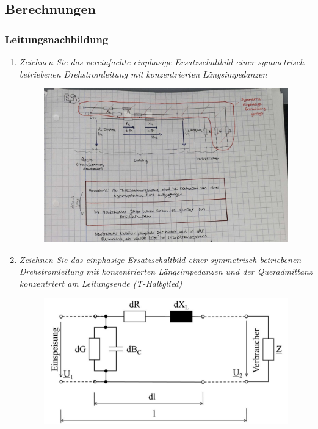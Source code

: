 \documentclass[12pt]{article}
\begin{document}
\subsection{Berechnungen}
\subsubsection{Leitungsnachbildung}



\begin{enumerate}
    \item \textit{Zeichnen Sie das vereinfachte einphasige 
    Ersatzschaltbild einer symmetrisch betriebenen 
    Drehstromleitung mit konzentrierten 
    Längsimpedanzen}\\
    \begin{figure}[h]
        \includegraphics[width=\textwidth]{figures/Schaltbild.jpg}
        \centering
    \end{figure}

    \item \textit{Zeichnen Sie das einphasige Ersatzschaltbild einer 
    symmetrisch betriebenen Drehstromleitung mit 
    konzentrierten Längsimpedanzen und der 
    Queradmittanz konzentriert am Leitungsende (T-Halbglied)}\\
    \begin{figure}[h]
        \includegraphics[width=\textwidth]{figures/T-Halbglied.PNG}
        \centering
    \end{figure}


\end{enumerate}
\end{document}
